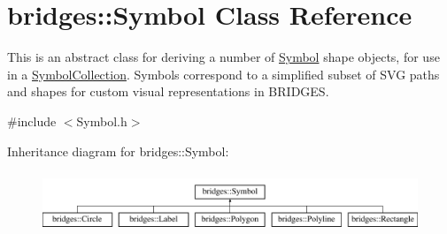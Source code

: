 \hypertarget{classbridges_1_1_symbol}{}\section{bridges\+:\+:Symbol Class Reference}
\label{classbridges_1_1_symbol}


This is an abstract class for deriving a number of \mbox{\hyperlink{classbridges_1_1_symbol}{Symbol}} shape objects, for use in a \mbox{\hyperlink{classbridges_1_1_symbol_collection}{Symbol\+Collection}}. Symbols correspond to a simplified subset of S\+VG paths and shapes for custom visual representations in B\+R\+I\+D\+G\+ES.  




{\ttfamily \#include $<$Symbol.\+h$>$}

Inheritance diagram for bridges\+:\+:Symbol\+:\begin{figure}[H]
\begin{center}
\leavevmode
\includegraphics[height=1.806452cm]{classbridges_1_1_symbol}
\end{center}
\end{figure}
